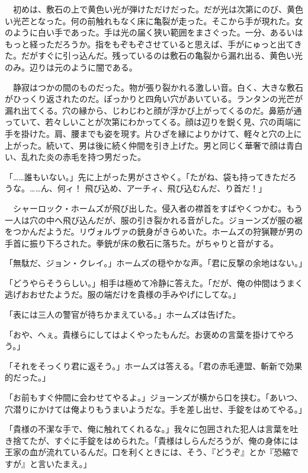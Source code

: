 \documentclass[tate,paper=b6j,jafontsize=9pt]{jlreq}
\begin{document}
　初めは、敷石の上で黄色い光が弾けただけだった。だが光は次第にのび、黄色い光芒となった。何の前触れもなく床に亀裂が走った。そこから手が現れた。女のように白い手であった。手は光の届く狭い範囲をまさぐった。一分、あるいはもっと経っただろうか。指をもぞもぞさせていると思えば、手がにゅっと出てきた。だがすぐに引っ込んだ。残っているのは敷石の亀裂から漏れ出る、黄色い光のみ。辺りは元のように闇である。

　静寂はつかの間のものだった。物が張り裂かれる激しい音。白く、大きな敷石がひっくり返されたのだ。ぽっかりと四角い穴があいている。ランタンの光芒が漏れ出てくる。穴の縁から、じわじわと顔が浮かび上がってくるのだ。鼻筋が通っていて、若々しいことが次第にわかってくる。顔は辺りを鋭く見、穴の両端に手を掛けた。肩、腰までも姿を現す。片ひざを縁によりかけて、軽々と穴の上に上がった。続いて、男は後に続く仲間を引き上げた。男と同じく華奢で顔は青白い、乱れた炎の赤毛を持つ男だった。

「……誰もいない。」先に上がった男がささやく。「たがね、袋も持ってきただろうな。……ん、何ィ！ 飛び込め、アーチィ、飛び込むんだ、り首だ！」

　シャーロック・ホームズが飛び出した。侵入者の襟首をすばやくつかむ。もう一人は穴の中へ飛び込んだが、服の引き裂かれる音がした。ジョーンズが服の裾をつかんだようだ。リヴォルヴァの銃身がきらめいた。ホームズの狩猟鞭が男の手首に振り下ろされた。拳銃が床の敷石に落ちた。がちゃりと音がする。


「無駄だ、ジョン・クレイ。」ホームズの穏やかな声。「君に反撃の余地はない。」

「どうやらそうらしい。」相手は極めて冷静に答えた。「だが、俺の仲間はうまく逃げおおせたようだ。服の端だけを貴様の手みやげにしてな。」

「表には三人の警官が待ちかまえている。」ホームズは告げた。

「おや、へぇ。貴様らにしてはよくやったもんだ。お褒めの言葉を掛けてやろう。」

「それをそっくり君に返そう。」ホームズは答える。「君の赤毛連盟、斬新で効果的だった。」

「お前もすぐ仲間に会わせてやるよ。」ジョーンズが横から口を挟む。「あいつ、穴潜りにかけては俺よりもうまいようだな。手を差し出せ、手錠をはめてやる。」

「貴様の不潔な手で、俺に触れてくれるな。」我々に包囲された犯人は言葉を吐き捨てたが、すぐに手錠をはめられた。「貴様はしらんだろうが、俺の身体には王家の血が流れているんだ。口を利くときには、そう、『どうぞ』とか『恐縮ですが』と言いたまえ。」
\end{document}
